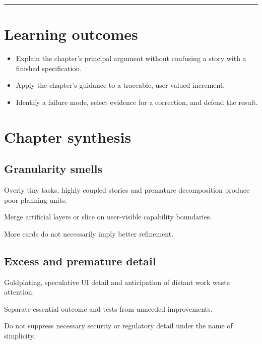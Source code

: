 \documentclass[11pt,letterpaper]{article}
\begin{document}
\tableofcontents\medskip\noindent\rule{\linewidth}{0.4pt}\medskip
\section{Learning outcomes}
\begin{itemize}[leftmargin=*,itemsep=2pt]
\item Explain the chapter's principal argument without confusing a story with a finished specification.
\item Apply the chapter's guidance to a traceable, user-valued increment.
\item Identify a failure mode, select evidence for a correction, and defend the result.
\end{itemize}
\section{Chapter synthesis}
\subsection{Granularity smells}
Overly tiny tasks, highly coupled stories and premature decomposition produce poor planning units.

\begin{tcolorbox}[colback=tealback,colframe=navy,title={Engineering translation},breakable]
Merge artificial layers or slice on user-visible capability boundaries.

\end{tcolorbox}
\begin{tcolorbox}[colback=amberback,colframe=navy,title={Failure mode to watch},breakable]
More cards do not necessarily imply better refinement.

\end{tcolorbox}
\subsection{Excess and premature detail}
Goldplating, speculative UI detail and anticipation of distant work waste attention.

\begin{tcolorbox}[colback=tealback,colframe=navy,title={Engineering translation},breakable]
Separate essential outcome and tests from unneeded improvements.

\end{tcolorbox}
\begin{tcolorbox}[colback=amberback,colframe=navy,title={Failure mode to watch},breakable]
Do not suppress necessary security or regulatory detail under the name of simplicity.

\end{tcolorbox}
\end{document}
